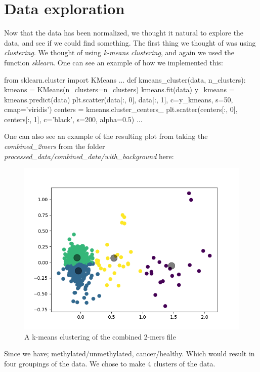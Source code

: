 \chapter{Data exploration}
Now that the data has been normalized, we thought it natural to explore the data, and see if we could find something. The first thing we thought of was using \textit{clustering}. We thought of using \textit{k-means clustering}, and again we used the function \textit{sklearn}. One can see an example of how we implemented this:

\begin{python}
from sklearn.cluster import KMeans
...
def kmeans_cluster(data, n_clusters):
    kmeans = KMeans(n_clusters=n_clusters)
    kmeans.fit(data)
    y_kmeans = kmeans.predict(data)
    plt.scatter(data[:, 0], data[:, 1], c=y_kmeans, s=50, cmap='viridis')
    centers = kmeans.cluster_centers_
    plt.scatter(centers[:, 0], centers[:, 1], c='black', s=200, alpha=0.5)
...
\end{python}

One can also see an example of the resulting plot from taking the \textit{combined\_2mers} from the folder \textit{processed\_data/combined\_data/with\_background} here:

\begin{figure}[H]
	\centering
	\includegraphics[width=0.7\linewidth]{../../figures/with_background/combined_2mers}
	\caption{A k-means clustering of the combined 2-mers file}
	\label{fig:kmeans0}
\end{figure}

Since we have; methylated/unmethylated, cancer/healthy. Which would result in four groupings of the data. We chose to make 4 clusters of the data.
